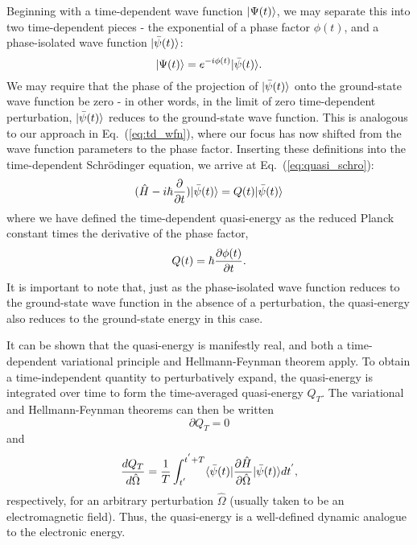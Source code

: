 {{Beginning with a time-dependent wave function $| \Psi(t) \rangle$, we may separate this into two time-dependent pieces - the exponential of a phase factor $\phi(t)$, and a phase-isolated wave function $| \bar\psi(t) \rangle$:
\begin{equation} \label{total_psi}
    | \Psi(t) \rangle = e^{-i\phi(t)}| \bar\psi(t) \rangle.
\end{equation}
We may require that the phase of the projection of $| \bar\psi(t) \rangle$ onto the ground-state wave function be 
zero - in other words, in the limit of zero time-dependent perturbation, $| \bar\psi(t) \rangle$ reduces to the
ground-state wave function. This is analogous to our approach in Eq.~(\ref{eq:td_wfn}), where our focus has
now shifted from the wave function parameters to the phase factor.
Inserting these definitions into the time-dependent Schr\"odinger equation,
we arrive at Eq.~(\ref{eq:quasi_schro}):
\begin{equation} \label{eq:quasi_schro}
    (\hat{H} - i\hbar \frac{\partial}{\partial t})| \bar\psi(t) \rangle = Q(t)| \bar\psi(t) \rangle
\end{equation}
where we have defined the time-dependent quasi-energy as the reduced Planck constant times the derivative
of the phase factor,
\begin{equation} \label{eq:quasi_e}
    Q(t) = \hbar\frac{\partial\phi(t)}{\partial t}.
\end{equation}
It is important to note that, just as the phase-isolated wave function reduces to the ground-state wave function in the absence of a perturbation, the quasi-energy also reduces to the ground-state energy in this case. 

It can be shown that the quasi-energy is manifestly real, and both a time-dependent variational 
principle and Hellmann-Feynman theorem apply.\cite{Norman2011} To obtain a time-independent 
quantity to perturbatively expand, the quasi-energy is integrated over time to form the 
time-averaged quasi-energy $Q_T$. The variational and Hellmann-Feynman theorems can then be written
\begin{equation} \label{eq:var}
    \partial Q_T = 0
\end{equation}
and
\begin{equation} \label{eq:hf-theorem}
    \frac{dQ_T}{d\hat\Omega} = \frac{1}{T}\int_{t^{'}}^{t^{'}+T}\langle\bar\psi(t) |\frac{\partial \hat{H}}{\partial\hat\Omega}| \bar\psi(t) \rangle dt^{'},
\end{equation}
respectively, for an arbitrary perturbation $\hat\Omega$ (usually taken to be an 
electromagnetic field). Thus, the quasi-energy is a well-defined dynamic analogue to the
electronic energy. 

}}
